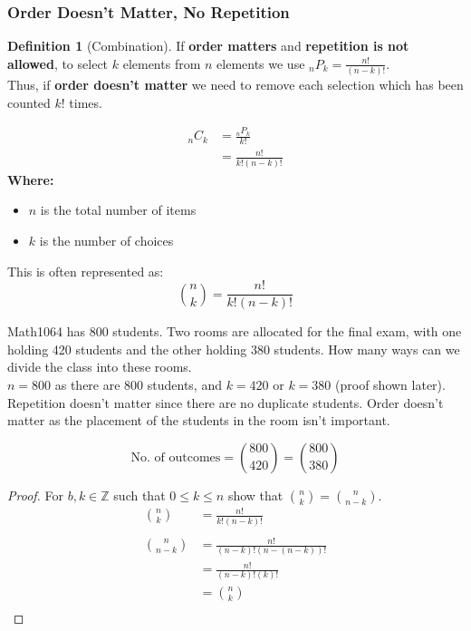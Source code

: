 \documentclass[12pt]{article}
\newcommand{\Z}{\mathbb{Z}}
\theoremstyle{definition}
\newtheorem{definition}{Definition}
\begin{document}
    \subsubsection{Order Doesn't Matter, No Repetition}
    \begin{definition}[Combination]
        \label{def:combination}
        If \textbf{order matters} and \textbf{repetition is not allowed}, to select $k$ elements from $n$ elements we use $_nP_k = \frac{n!}{(n-k)!}$. \\
        Thus, if \textbf{order doesn't matter} we need to remove each selection which has been counted $k!$ times.

        \begin{align*}
            _nC_k &= \frac{_nP_k}{k!} \\
            &= \frac{n!}{k!(n-k)!}
        \end{align*}
        \textbf{Where:}
        \begin{itemize}
            \item $n$ is the total number of items
            \item $k$ is the number of choices
        \end{itemize}

        This is often represented as:
        \begin{equation*}
            \binom{n}{k} = \frac{n!}{k!(n-k)!}
        \end{equation*}
    \end{definition}

    \begin{example}
        Math1064 has 800 students. Two rooms are allocated for the final exam, with one holding 420 students and the other holding 380 students.
        How many ways can we divide the class into these rooms. \\

        \textbf{$n = 800$} as there are 800 students, and \textbf{$k = 420$} or \textbf{$k = 380$} (proof shown later). 
        Repetition doesn't matter since there are no duplicate students. Order doesn't matter as the placement of the
        students in the room isn't important.

        \begin{equation*}
            \text{No. of outcomes} = \binom{800}{420} = \binom{800}{380}
        \end{equation*}
    \end{example}

    \begin{proof}
        For $b,k \in \Z$ such that $0 \le k \le n$ show that $\binom{n}{k} = \binom{n}{n-k}$.
        \begin{align*}
            \binom{n}{k} &= \frac{n!}{k!(n-k)!} \\\\
            \binom{n}{n-k} &= \frac{n!}{(n-k)!(n-(n-k))!} \\
            &= \frac{n!}{(n-k)!(k)!} \\
            &= \binom{n}{k} \\
        \end{align*}
    \end{proof}
\end{document}
